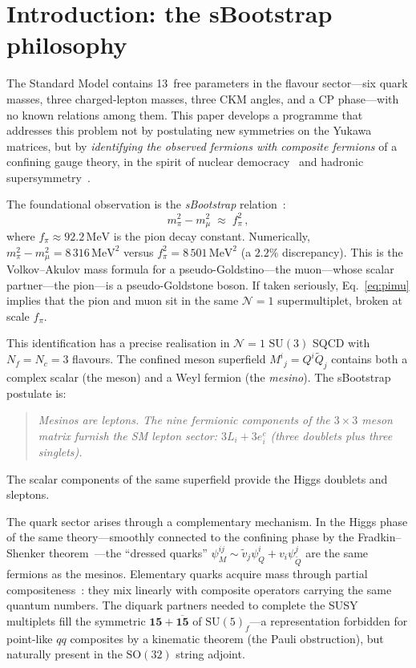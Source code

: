 \documentclass[12pt,a4paper]{article}
\newcommand{\SU}{\mathrm{SU}}
\newcommand{\SO}{\mathrm{SO}}
\newcommand{\Nf}{N_{\!f}}
\newcommand{\Nc}{N_{\!c}}
\newcommand{\MeV}{\,\mathrm{MeV}}
\begin{document}
\tableofcontents
\newpage

\section{Introduction: the sBootstrap philosophy}
\label{sec:intro}

The Standard Model contains 13~free parameters in the flavour
sector---six quark masses, three charged-lepton masses, three CKM
angles, and a CP phase---with no known relations among them.
This paper develops a programme that addresses this problem not by
postulating new symmetries on the Yukawa matrices, but by
\emph{identifying the observed fermions with composite fermions}
of a confining gauge theory, in the spirit of nuclear
democracy~\cite{Chew:1962} and hadronic
supersymmetry~\cite{Miyazawa:1966,CattoGursey:1985}.

The foundational observation is the \emph{sBootstrap}
relation~\cite{Rivero:2024epjc}:
\begin{equation}
  m_\pi^2 - m_\mu^2 \;\approx\; f_\pi^2\,,
  \label{eq:pimu}
\end{equation}
where $f_\pi \approx 92.2\MeV$ is the pion decay constant.
Numerically, $m_\pi^2 - m_\mu^2 = 8\,316\MeV^2$ versus
$f_\pi^2 = 8\,501\MeV^2$ (a $2.2\%$ discrepancy).
This is the Volkov--Akulov mass formula for a
pseudo-Goldstino---the muon---whose scalar partner---the pion---is
a pseudo-Goldstone boson.
If taken seriously, Eq.~\eqref{eq:pimu} implies that
the pion and muon sit in the same $\mathcal{N}{=}1$ supermultiplet,
broken at scale $f_\pi$.

This identification has a precise realisation in
$\mathcal{N}{=}1$ $\SU(3)$ SQCD with $\Nf = \Nc = 3$ flavours.
The confined meson superfield $M^i{}_j = Q^i\tilde{Q}_j$
contains both a complex scalar (the meson) and a Weyl fermion
(the \emph{mesino}).
The sBootstrap postulate is:
\begin{quote}
\emph{Mesinos are leptons.  The nine fermionic components
of the $3 \times 3$ meson matrix furnish the SM lepton sector:
$3L_i + 3e^c_i$ (three doublets plus three singlets).}
\end{quote}
The scalar components of the same superfield provide the
Higgs doublets and sleptons.

The quark sector arises through a complementary mechanism.
In the Higgs phase of the same theory---smoothly connected to
the confining phase by the Fradkin--Shenker
theorem~\cite{FradkinShenker:1979}---the ``dressed quarks''
$\psi_M^{ij} \sim \tilde{v}_j \psi_Q^i + v_i \psi_{\tilde{Q}}^j$
are the same fermions as the mesinos.
Elementary quarks acquire mass through partial
compositeness~\cite{Kaplan:1991dc}: they mix linearly with
composite operators carrying the same quantum numbers.
The diquark partners needed to complete the SUSY multiplets
fill the symmetric $\mathbf{15} + \overline{\mathbf{15}}$ of
$\SU(5)_f$---a representation forbidden for point-like $qq$
composites by a kinematic theorem (the Pauli obstruction),
but naturally present in the $\SO(32)$ string adjoint.
\end{document}
